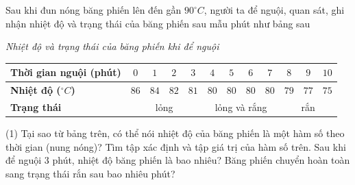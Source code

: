 \begin{bt}%
	Sau khi đun nóng băng phiến lên đến gần $90^{\circ}C$, người ta để nguội, quan sát, ghi nhận nhiệt độ và trạng thái của băng phiến sau mẫu phút như bảng  sau
	\begin{center}
		\textit{Nhiệt độ và trạng thái của băng phiến khi để  nguội}
		\begin{tabular}{|l|c|c|c|c|c|c|c|c|c|c|c|}
			\hline 
			\textbf{Thời gian nguội (phút)} & $0$ & $1$ & $2$ & $3$ & $4$ & $5$ & $6$ & $7$ & $8$ & $9$ & $10$ \\ 
			 \hline
			\textbf{Nhiệt độ ($^{\circ}C$)} & $86$ & $84$ & $82$ &  $81$ & $80$ & $80$ & $80$ &$80$ & $79$ & $77$ & $75$ \\
			\hline 
			\textbf{Trạng thái} & \multicolumn{4}{|c|}{lỏng} &\multicolumn{4}{|c|}{lỏng và rắng} & \multicolumn{3}{|c|}{rắn}\\ 
			 \hline
		\end{tabular}
	\end{center}
	\begin{tasks}(1)
		\task Tại sao từ  bảng trên, có thể nói nhiệt độ của băng phiến là một hàm số theo thời gian (nung nóng)? Tìm tập xác định và tập giá trị của hàm số trên.
		\task Sau khi  để nguội $3$ phút, nhiệt độ băng phiến là bao nhiêu?
		\task Băng phiến chuyển hoàn toàn sang trạng thái rắn sau  bao nhiêu phút?
	\end{tasks}
\end{bt}

